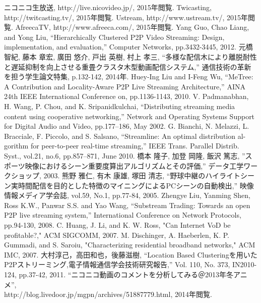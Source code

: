%
%
\begin{thebibliography}{99}

  ニコニコ生放送, http://live.nicovideo.jp/, 2015年閲覧.
  Twicasting, http://twitcasting.tv/, 2015年閲覧.
  Ustream, http://www.ustream.tv/, 2015年閲覧.
  AfreecaTV, http://www.afreeca.com/, 2015年閲覧.
  Yang Guo, Chao Liang, and Yong Liu, “Hierarchically Clustered P2P Video Streaming: Design, implementation, and evaluation,” Computer Networks, pp.3432-3445, 2012.
  元橋 智紀, 藤本 章宏, 廣田 悠介, 戸出 英樹, 村上 孝三, “多様な配信木により離脱耐性と遅延抑制を向上させる重畳クラスタ木型動画配信システム,” 通信技術の革新を担う学生論文特集, p.132-142, 2014年.
  Huey-Ing Liu and I-Feng Wu, “MeTree: A Contribution and Locality-Aware P2P Live Streaming Architecture,” AINA 24th IEEE International Conference on, pp.1136-1143, 2010.
  V. Padmanabhan, H. Wang, P. Chou, and K. Sripanidkulchai, “Distributing streaming media content using cooperative networking,” Network and Operating Systems Support for Digital Audio and Video, pp.177–186, May 2002.
  G. Bianchi, N. Melazzi, L. Bracciale, F. Piccolo, and S. Salsano, “Streamline: An optimal distribution al-gorithm for peer-to-peer real-time streaming,” IEEE Trans. Parallel Distrib. Syst., vol.21, no.6, pp.857–871, June 2010.
  橋本 隆子, 加登 岡隆, 飯沢 篤志, ”スポーツ映像におけるシーン重要度算出アルゴリズムとその評価,” データ工学ワークショップ, 2003.
  熊野 雅仁, 有木 康雄, 塚田 清志, “野球中継のハイライトシーン実時間配信を目的とした特徴のマイニングによるPCシーンの自動検出,” 映像情報メディア学会誌, vol.59, No.1, pp.77-84, 2005.
  Zhengye Liu, Yanming Shen, Ross K.W., Panwar S.S. and Yao Wang, “Substream Trading: Towards an open P2P live streaming system,” International Conference on Network Protocols, pp.94-130, 2008.
  C. Huang, J. Li, and K. W. Ross, "Can Internet VoD be profitable?," ACM SIGCOMM, 2007.
  M. Dischinger, A. Haeberlen, K. P. Gummadi, and S. Saroiu, "Characterizing residential broadband networks," ACM IMC, 2007.
  大村淳己，高田和也，後藤滋樹, “Location Based Clusteringを用いたP2Pストリーミング,電子情報通信学会技術研究報告,” Vol. 110, No. 373, IN2010-124, pp.37-42, 2011.
  “ニコニコ動画のコメントを分析してみる＠2013年冬アニメ”, \\ http://blog.livedoor.jp/mgpn/archives/51887779.html, 2014年閲覧.
\end{thebibliography}

